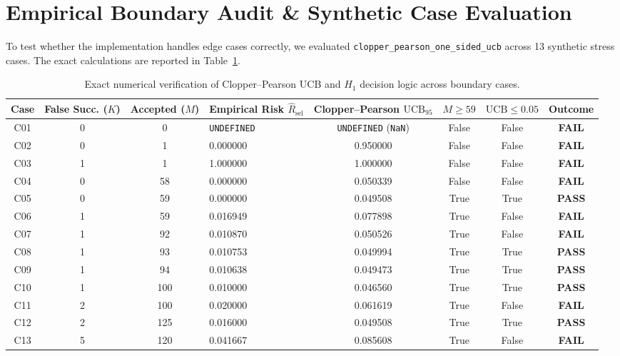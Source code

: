 \documentclass[10pt,a4paper]{article}
\begin{document}
\section{Empirical Boundary Audit \& Synthetic Case Evaluation}
To test whether the implementation handles edge cases correctly, we evaluated \texttt{clopper\_pearson\_one\_sided\_ucb} across 13 synthetic stress cases. The exact calculations are reported in Table~\ref{tab:h1_cases}.

\begin{table}[h!]
\centering
\small
\begin{tabularx}{\textwidth}{cccXcccc}
\toprule
\textbf{Case} & \textbf{False Succ.} ($K$) & \textbf{Accepted} ($M$) & \textbf{Empirical Risk} $\hat{R}_{\mathrm{sel}}$ & \textbf{Clopper--Pearson} $\mathrm{UCB}_{95}$ & $M \ge 59$ & $\mathrm{UCB} \le 0.05$ & \textbf{Outcome} \\
\midrule
C01 & 0 & 0 & \texttt{UNDEFINED} & \texttt{UNDEFINED} (\texttt{NaN}) & False & False & \textbf{FAIL} \\
C02 & 0 & 1 & 0.000000 & 0.950000 & False & False & \textbf{FAIL} \\
C03 & 1 & 1 & 1.000000 & 1.000000 & False & False & \textbf{FAIL} \\
C04 & 0 & 58 & 0.000000 & 0.050339 & False & False & \textbf{FAIL} \\
C05 & 0 & 59 & 0.000000 & 0.049508 & True & True & \textbf{PASS} \\
C06 & 1 & 59 & 0.016949 & 0.077898 & True & False & \textbf{FAIL} \\
C07 & 1 & 92 & 0.010870 & 0.050526 & True & False & \textbf{FAIL} \\
C08 & 1 & 93 & 0.010753 & 0.049994 & True & True & \textbf{PASS} \\
C09 & 1 & 94 & 0.010638 & 0.049473 & True & True & \textbf{PASS} \\
C10 & 1 & 100 & 0.010000 & 0.046560 & True & True & \textbf{PASS} \\
C11 & 2 & 100 & 0.020000 & 0.061619 & True & False & \textbf{FAIL} \\
C12 & 2 & 125 & 0.016000 & 0.049508 & True & True & \textbf{PASS} \\
C13 & 5 & 120 & 0.041667 & 0.085608 & True & False & \textbf{FAIL} \\
\bottomrule
\end{tabularx}
\caption{Exact numerical verification of Clopper--Pearson UCB and $H_1$ decision logic across boundary cases.}
\label{tab:h1_cases}
\end{table}
\end{document}
